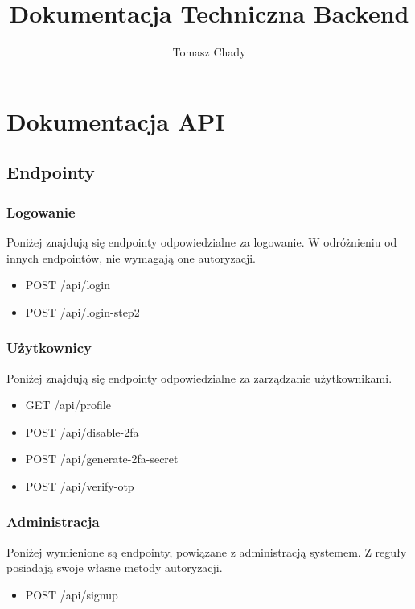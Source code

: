 \documentclass{documentation}
\title{Dokumentacja Techniczna Backend}
\author{Tomasz Chady}
\begin{document}
\maketitle

\tableofcontents

\section{Dokumentacja API}

\subsection{Endpointy}

\subsubsection{Logowanie}

Poniżej znajdują się endpointy odpowiedzialne za logowanie.
W odróżnieniu od innych endpointów, nie wymagają one autoryzacji.

\begin{itemize}
    \item POST /api/login
    \item POST /api/login-step2
\end{itemize}

\subsubsection{Użytkownicy}

Poniżej znajdują się endpointy odpowiedzialne za zarządzanie użytkownikami.

\begin{itemize}
    \item GET /api/profile
    \item POST /api/disable-2fa
    \item POST /api/generate-2fa-secret
    \item POST /api/verify-otp
\end{itemize}

\subsubsection{Administracja}

Poniżej wymienione są endpointy, powiązane z administracją systemem.
Z reguły posiadają swoje własne metody autoryzacji.

\begin{itemize}
    \item POST /api/signup
\end{itemize}
\end{document}

